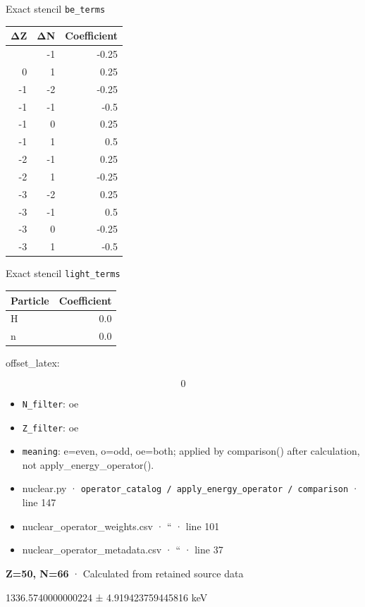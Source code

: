 \documentclass[
  11pt,
  letterpaper,
]{article}
\begin{document}
Exact stencil \texttt{be\_terms}

\begin{longtable}[]{@{}rrr@{}}
\toprule\noalign{}
ΔZ & ΔN & Coefficient \\
\midrule\noalign{}
\endhead
\bottomrule\noalign{}
\endlastfoot
0 & -1 & -0.25 \\
0 & 1 & 0.25 \\
-1 & -2 & -0.25 \\
-1 & -1 & -0.5 \\
-1 & 0 & 0.25 \\
-1 & 1 & 0.5 \\
-2 & -1 & 0.25 \\
-2 & 1 & -0.25 \\
-3 & -2 & 0.25 \\
-3 & -1 & 0.5 \\
-3 & 0 & -0.25 \\
-3 & 1 & -0.5 \\
\end{longtable}

Exact stencil \texttt{light\_terms}

\begin{longtable}[]{@{}lr@{}}
\toprule\noalign{}
Particle & Coefficient \\
\midrule\noalign{}
\endhead
\bottomrule\noalign{}
\endlastfoot
H & 0.0 \\
n & 0.0 \\
\end{longtable}

offset\_latex:

\[
0
\]

\begin{itemize}
\item
  \texttt{N\_filter}: oe
\item
  \texttt{Z\_filter}: oe
\item
  \texttt{meaning}: e=even, o=odd, oe=both; applied by comparison()
  after calculation, not apply\_energy\_operator().
\item
  nuclear.py ·
  \texttt{operator\_catalog\ /\ apply\_energy\_operator\ /\ comparison}
  · line 147
\item
  nuclear\_operator\_weights.csv · `` · line 101
\item
  nuclear\_operator\_metadata.csv · `` · line 37
\end{itemize}

\textbf{Z=50, N=66} · Calculated from retained source data

1336.5740000000224 ± 4.919423759445816 keV
\end{document}
